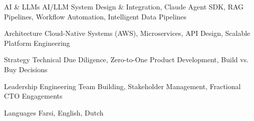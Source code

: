 

\begin{cvskills}

  \cvskill
    {AI \& LLMs} %
    {AI/LLM System Design \& Integration, Claude Agent SDK, RAG Pipelines, Workflow Automation, Intelligent Data Pipelines} %

  \cvskill
    {Architecture} %
    {Cloud-Native Systems (AWS), Microservices, API Design, Scalable Platform Engineering} %

  \cvskill
    {Strategy} %
    {Technical Due Diligence, Zero-to-One Product Development, Build vs. Buy Decisions} %

  \cvskill
    {Leadership} %
    {Engineering Team Building, Stakeholder Management, Fractional CTO Engagements} %

  \cvskill
    {Languages} %
    {Farsi, English, Dutch} %

\end{cvskills}
